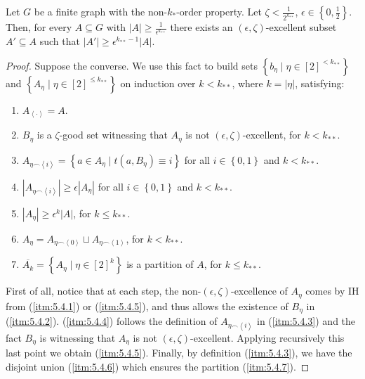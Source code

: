     \lemma[Claim 5.4]\label{existance_of_excellent_subsets}
        Let $G$ be a finite graph with the non-$k_{*}$-order property.
        Let $\zeta < \frac{1}{2^{k_{**}}}$, $\epsilon \in \left\{ 0, \frac{1}{2} \right\}$.
        Then, for every $A \subseteq G$ with $|A| \geq \frac{1}{\epsilon^{k_{**}}}$ there exists an $(\epsilon, \zeta)$-excellent
        subset $A' \subseteq A$ such that $|A'| \geq \epsilon^{k_{**}-1} |A|$.
        \begin{proof}
            Suppose the converse.
            We use this fact to build sets $\left\{ b_\eta \mid \eta \in [2]^{<k_{**}} \right\}$ and
            $\left\{ A_\eta \mid \eta \in [2]^{\leq k_{**}} \right\}$ on induction over $k<k_{**}$, where $k = |\eta|$,
            satisfying:
            \begin{enumerate}
                \item\label{itm:5.4.1} $A_{\left< \cdot \right>} = A$.
                \item\label{itm:5.4.2} $B_\eta$ is a $\zeta$-good set witnessing that $A_\eta$ is not
                    $(\epsilon, \zeta)$-excellent, for $k < k_{**}$.
                \item\label{itm:5.4.3} $A_{\eta \frown \left< i \right>} = \left\{ a \in A_\eta \mid t(a, B_\eta) \equiv i \right\}$
                    for all $i \in \left\{ 0,1 \right\}$ and $k < k_{**}$.
                \item\label{itm:5.4.4} $|A_{\eta \frown \left< i \right>}| \geq \epsilon |A_\eta|$
                    for all $i \in \left\{ 0,1 \right\}$ and $k < k_{**}$.
                \item\label{itm:5.4.5} $|A_\eta| \geq \epsilon^k |A|$, for $k \leq k_{**}$.
                \item\label{itm:5.4.6} $A_\eta = A_{\eta \frown \left< 0 \right>} \sqcup A_{\eta \frown \left< 1 \right>}$,
                    for $k < k_{**}$.
                \item\label{itm:5.4.7} $\overline{A_k} = \left\{ A_\eta \mid \eta \in [2]^k \right\}$ is a partition of $A$,
                    for $k \leq k_{**}$.
            \end{enumerate}
            First of all, notice that at each step, the non-$(\epsilon, \zeta)$-excellence of $A_\eta$ comes by IH
            from (\ref{itm:5.4.1}) or (\ref{itm:5.4.5}), and thus allows the existence of $B_\eta$ in (\ref{itm:5.4.2}).
            (\ref{itm:5.4.4}) follows the definition of $A_{\eta \frown \left< i \right>}$ in (\ref{itm:5.4.3}) and
            the fact $B_\eta$ is witnessing that $A_\eta$ is not $(\epsilon, \zeta)$-excellent.
            Applying recursively this last point we obtain (\ref{itm:5.4.5}).
            Finally, by definition (\ref{itm:5.4.3}), we have the disjoint union (\ref{itm:5.4.6}) which ensures
            the partition (\ref{itm:5.4.7}).


\end{proof}

